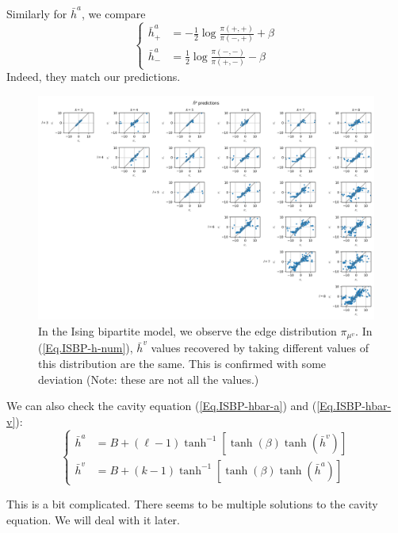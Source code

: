 \documentclass[12pt]{article}
\numberwithin{equation}{section}
\begin{document}
Similarly for $\bar{h}^a$, we compare
\begin{equation*}
    \begin{cases}
        \bar{h}^a_+ & = -\frac12\log\frac{\pi(+, +)}{\pi(-, +)} + \beta \\
        \bar{h}^a_- & = \frac12\log\frac{\pi(-, -)}{\pi(+, -)} - \beta
    \end{cases}
\end{equation*}
Indeed, they match our predictions.
\begin{figure}[!h]
    \centering
    \includegraphics[width=16cm]{img/Ising_bptt/ha_pred.png}
    \caption{In the Ising bipartite model, we observe the edge distribution $\pi_{\mu^v}$. In (\ref{Eq.ISBP-h-num}), $\bar{h}^v$
        values recovered by taking different values of this distribution are the same. This is confirmed with some
        deviation (Note: these are not all the values.)}
    \label{Fig.ISBP-ha-guess}
\end{figure}

\newpage

We can also check the cavity equation (\ref{Eq.ISBP-hbar-a}) and (\ref{Eq.ISBP-hbar-v}):
\begin{equation*}
    \begin{cases}
        \bar{h}^a & = B + (\ell - 1)\tanh^{-1}[\tanh(\beta)\tanh(\bar{h}^v)] \\
        \bar{h}^v & = B + (k - 1)\tanh^{-1}[\tanh(\beta)\tanh(\bar{h}^a)]
    \end{cases}
\end{equation*}

This is a bit complicated. There seems to be multiple solutions to the cavity equation. We will deal with it later.
\end{document}

